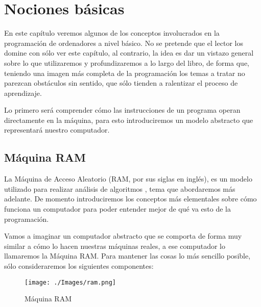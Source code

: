 \chapter{Nociones básicas}

En este capítulo veremos algunos de los conceptos involucrados en la programación de ordenadores a nivel básico. No se pretende que el lector los domine con sólo ver este capítulo, al contrario, la idea es dar un vistazo general sobre lo que utilizaremos y profundizaremos a lo largo del libro, de forma que, teniendo una imagen más completa de la programación los temas a tratar no parezcan obstáculos sin sentido, que sólo tienden a ralentizar el proceso de aprendizaje. 

Lo primero será comprender cómo las instrucciones de un programa operan directamente en la máquina, para esto introduciremos un modelo abstracto que representará nuestro computador.

\section{Máquina RAM}

 La Máquina de Acceso Aleatorio (RAM, por sus siglas en inglés), es un modelo utilizado para realizar análisis de algoritmos \cite[p.~31]{algDsgn}, tema que abordaremos más adelante. De momento introduciremos los conceptos más elementales sobre cómo funciona un computador para poder entender mejor de qué va esto de la programación. 
 
Vamos a imaginar un computador abstracto que se comporta de forma muy similar a cómo lo hacen nuestras máquinas reales, a ese computador lo llamaremos la Máquina RAM. Para mantener las cosas lo más sencillo posible, sólo consideraremos los siguientes componentes:


\begin{figure}[h!]
	\centering
	\texttt{[image: ./Images/ram.png]}
	\caption{Máquina RAM}
	\label{figram}
\end{figure}




